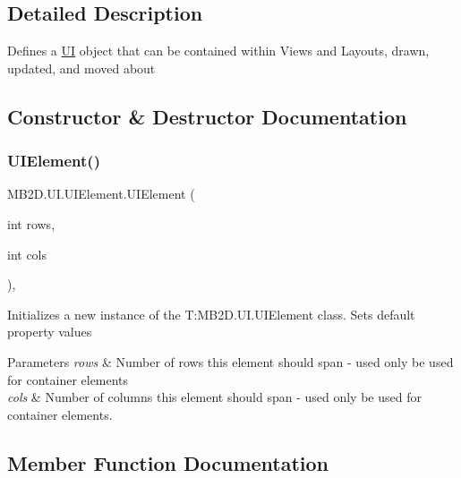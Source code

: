 \subsection{Detailed Description}
Defines a \hyperlink{namespace_m_b2_d_1_1_u_i}{UI} object that can be contained within Views and Layouts, drawn, updated, and moved about 



\subsection{Constructor \& Destructor Documentation}
\hypertarget{class_m_b2_d_1_1_u_i_1_1_u_i_element_a508bd28173afc58ba1214672a013f802}{}\label{class_m_b2_d_1_1_u_i_1_1_u_i_element_a508bd28173afc58ba1214672a013f802} 
\subsubsection{\texorpdfstring{U\+I\+Element()}{UIElement()}}
{\footnotesize\ttfamily M\+B2\+D.\+U\+I.\+U\+I\+Element.\+U\+I\+Element (\begin{DoxyParamCaption}\item[{int}]{rows,  }\item[{int}]{cols }\end{DoxyParamCaption})\hspace{0.3cm}{\ttfamily [inline]}, {\ttfamily [protected]}}



Initializes a new instance of the T\+:\+M\+B2\+D.\+U\+I.\+U\+I\+Element class. Sets default property values 


\begin{DoxyParams}{Parameters}
{\em rows} & Number of rows this element should span -\/ used only be used for container elements \\
\hline
{\em cols} & Number of columns this element should span -\/ used only be used for container elements. \\
\hline
\end{DoxyParams}


\subsection{Member Function Documentation}
\hypertarget{class_m_b2_d_1_1_u_i_1_1_u_i_element_afec98e6e38cb0dbc17a5db6d6a3d5ba5}{}\label{class_m_b2_d_1_1_u_i_1_1_u_i_element_afec98e6e38cb0dbc17a5db6d6a3d5ba5} 
